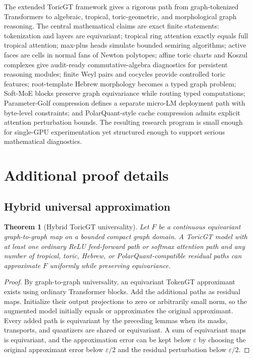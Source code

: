 \documentclass[11pt]{article}
\theoremstyle{definition}
\theoremstyle{plain}
\newtheorem{theorem}[definition]{Theorem}
\theoremstyle{remark}
\numberwithin{equation}{section}
\begin{document}
The extended ToricGT framework gives a rigorous path from graph-tokenized Transformers to algebraic, tropical, toric-geometric, and morphological graph reasoning.  The central mathematical claims are exact finite statements: tokenization and layers are equivariant; tropical ring attention exactly equals full tropical attention; max-plus heads simulate bounded semiring algorithms; active faces are cells in normal fans of Newton polytopes; affine toric charts and Koszul complexes give audit-ready commutative-algebra diagnostics for persistent reasoning modules; finite Weyl pairs and cocycles provide controlled toric features; root-template Hebrew morphology becomes a typed graph problem; Soft-MoE blocks preserve graph equivariance while routing typed computations; Parameter-Golf compression defines a separate micro-LM deployment path with byte-level constraints; and PolarQuant-style cache compression admits explicit attention perturbation bounds.  The resulting research program is small enough for single-GPU experimentation yet structured enough to support serious mathematical diagnostics.

\appendix

\section{Additional proof details}

\subsection{Hybrid universal approximation}

\begin{theorem}[Hybrid ToricGT universality]
Let $F$ be a continuous equivariant graph-to-graph map on a bounded compact graph domain.  A ToricGT model with at least one ordinary ReLU feed-forward path or softmax attention path and any number of tropical, toric, Hebrew, or PolarQuant-compatible residual paths can approximate $F$ uniformly while preserving equivariance.
\end{theorem}

\begin{proof}
By graph-to-graph universality, an equivariant TokenGT approximant exists using ordinary Transformer blocks.  Add the additional paths as residual maps.  Initialize their output projections to zero or arbitrarily small norm, so the augmented model initially equals or approximates the original approximant.  Every added path is equivariant by the preceding lemmas when its masks, transports, and quantizers are shared or equivariant.  A sum of equivariant maps is equivariant, and the approximation error can be kept below $\varepsilon$ by choosing the original approximant error below $\varepsilon/2$ and the residual perturbation below $\varepsilon/2$.
\end{proof}
\end{document}
